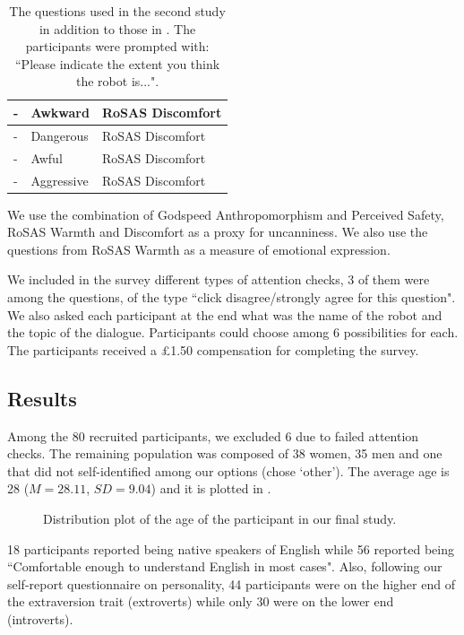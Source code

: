 \documentclass[nomenclature, english, biblatex]{kththesis}
\begin{document}
\begin{table}
\begin{adjustbox}{max width=\textwidth}
\begin{tabular}{|p{}|p{}|p{}|}
        - & Awkward & RoSAS Discomfort\\
        \hline
        - & Dangerous & RoSAS Discomfort\\
        \hline
        - & Awful & RoSAS Discomfort\\
        \hline
        - & Aggressive & RoSAS Discomfort\\
        \hline
        \end{tabular}
    \end{adjustbox}
    \caption{The questions used in the second study in addition to those in . The participants were prompted with: ``Please indicate the extent you think the robot is...".}
    \label{tab:study_survey}
\end{table}

We use the combination of Godspeed Anthropomorphism and Perceived Safety, RoSAS Warmth and Discomfort as a proxy for uncanniness. We also use the questions from RoSAS Warmth as a measure of emotional expression.

We included in the survey different types of attention checks, 3 of them were among the questions, of the type ``click disagree/strongly agree for this question". We also asked each participant at the end what was the name of the robot and the topic of the dialogue. Participants could choose among 6 possibilities for each. The participants received a £1.50 compensation for completing the survey.
\subsection{Results}
Among the 80 recruited participants, we excluded 6 due to failed attention checks. The remaining population was composed of 38 women, 35 men and one that did not self-identified among our options (chose `other'). The average age is 28 ($M=28.11$, $SD=9.04$) and it is plotted in .
\begin{figure}
    \centering
    \begin{adjustbox}{max width=\textwidth}
         
    \end{adjustbox}
    \caption{Distribution plot of the age of the participant in our final study.}
    \label{fig:study_age}
\end{figure}
18 participants reported being native speakers of English while 56 reported being ``Comfortable enough to understand English in most cases". Also, following our self-report questionnaire on personality, 44 participants were on the higher end of the extraversion trait (extroverts) while only 30 were on the lower end (introverts). 
\end{document}
